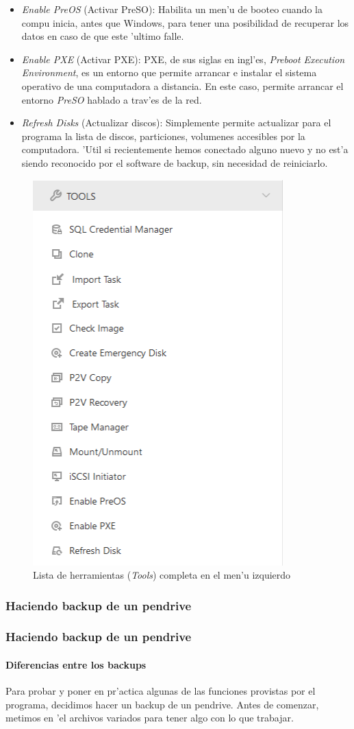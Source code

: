 \documentclass[11pt]{article}
\begin{document}
\begin{itemize}
		\item \textit{Enable PreOS} (Activar PreSO): Habilita un men'u de booteo cuando la compu inicia, antes que Windows, para tener una posibilidad de recuperar los datos en caso de que este 'ultimo falle.
		\item \textit{Enable PXE} (Activar PXE): PXE, de sus siglas en ingl'es, \textit{Preboot Execution Environment}, es un entorno que permite arrancar e instalar el sistema operativo de una computadora a distancia. En este caso, permite arrancar el entorno \textit{PreSO} hablado a trav'es de la red.
		\item \textit{Refresh Disks} (Actualizar discos): Simplemente permite actualizar para el programa la lista de discos, particiones, volumenes accesibles por la computadora. 'Util si recientemente hemos conectado alguno nuevo y no est'a siendo reconocido por el software de backup, sin necesidad de reiniciarlo.
	\end{itemize}
	
	\begin{figure}[H]
		\centering
		\includegraphics[width=.34\textwidth]{Images/easeus/use_tools}
		\caption{Lista de herramientas (\textit{Tools}) completa en el men'u izquierdo}
	\end{figure}
	
	\subsubsection{Haciendo backup de un pendrive}

	
	\subsubsection{Haciendo backup de un pendrive}
	\paragraph{Diferencias entre los backups}
    Para probar y poner en pr'actica algunas de las funciones provistas por el programa, decidimos hacer un backup de un pendrive. Antes de comenzar, metimos en 'el archivos variados para tener algo con lo que trabajar.
\end{document}
